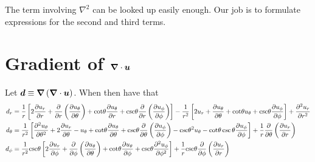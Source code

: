\documentclass[10pt, letterpaper]{article}
\begin{document}
The term involving $\nabla^2$ can be looked up easily enough.   Our job is to formulate expressions for the second and third terms.

\section{Gradient of $\boldsymbol{\nabla}\cdot\boldsymbol{u}$}
Let $\boldsymbol{d}\equiv\boldsymbol{\nabla}\left(\boldsymbol{\nabla}\cdot\boldsymbol{u}\right)$.   When then have that
\begin{align}
d_r& =  \frac{1}{r} \left[2 \frac{\partial u_r}{\partial r} + \frac{\partial}{\partial r} \left(\frac{\partial u_{\theta}}{\partial \theta} \right) + \mathrm{cot}\theta \frac{\partial u_{\theta}}{\partial r} + \mathrm{csc}\theta \frac{\partial}{\partial r} \left(\frac{\partial u_{\phi}}{\partial \phi} \right) \right] - \frac{1}{r^2} \left[2 u_r + \frac{\partial u_{\theta}}{\partial \theta} + \mathrm{cot}\theta u_{\theta} + \mathrm{csc}\theta \frac{\partial u_{\phi}}{\partial \phi} \right] + \frac{\partial^2 u_r}{\partial r^2}        \\
d_\theta& = \frac{1}{r^2} \left[\frac{\partial^2 u_{\theta}}{\partial \theta^2} + 2 \frac{\partial u_r}{\partial \theta} - u_{\theta} + \mathrm{cot}\theta \frac{\partial u_{\theta}}{\partial \theta} + \mathrm{csc}\theta \frac{\partial}{\partial \theta} \left(\frac{\partial u_{\phi}}{\partial \phi} \right) - \mathrm{csc}\theta^2 u_{\theta} - \mathrm{cot}\theta \csc\theta \frac{\partial u_{\phi}}{\partial \phi} \right] + \frac{1}{r} \frac{\partial}{\partial \theta} \left(\frac{\partial u_r}{\partial r} \right)     \\
d_\phi& = \frac{1}{r^2} \mathrm{csc}\theta \left[2 \frac{\partial u_r}{\partial \phi} + \frac{\partial}{\partial \phi} \left(\frac{\partial u_{\theta}}{\partial \theta} \right) + \mathrm{cot}\theta \frac{\partial u_{\theta}}{\partial \phi} + \mathrm{csc}\theta \frac{\partial^2 u_{\phi}}{\partial \phi^2} \right] + \frac{1}{r} \mathrm{csc}\theta \frac{\partial}{\partial \phi} \left(\frac{\partial u_r}{\partial r} \right)
\end{align}
\end{document}
